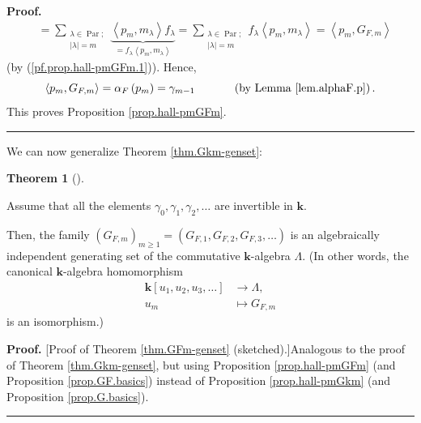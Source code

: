 \documentclass[numbers=enddot,12pt,final,onecolumn,notitlepage]{scrartcl}%
\theoremstyle{definition}
\newtheorem{theo}{Theorem}[section]
\newenvironment{theorem}[1][]
{\begin{theo}[#1]\begin{leftbar}}
{\end{leftbar}\end{theo}}
\newenvironment{proof}[1][Proof]{\noindent\textbf{#1.} }{\ \rule{0.5em}{0.5em}}
\let\sumnonlimits\sum
\renewcommand{\sum}{\sumnonlimits\limits}
\newenvironment{verlong}{}{}
\newenvironment{vershort}{}{}
\begin{document}
\begin{verlong}
\begin{proof}
\begin{align*}
&  =\sum_{\substack{\lambda\in\operatorname*{Par};\\\left\vert \lambda
\right\vert =m}}\underbrace{\left\langle p_{m},m_{\lambda}\right\rangle
f_{\lambda}}_{=f_{\lambda}\left\langle p_{m},m_{\lambda}\right\rangle }%
=\sum_{\substack{\lambda\in\operatorname*{Par};\\\left\vert \lambda\right\vert
=m}}f_{\lambda}\left\langle p_{m},m_{\lambda}\right\rangle =\left\langle
p_{m},G_{F,m}\right\rangle
\end{align*}
(by (\ref{pf.prop.hall-pmGFm.1})). Hence,%
\[
\left\langle p_{m},G_{F,m}\right\rangle =\alpha_{F}\left(  p_{m}\right)
=\gamma_{m-1}\ \ \ \ \ \ \ \ \ \ \left(  \text{by Lemma \ref{lem.alphaF.p}%
}\right)  .
\]
This proves Proposition \ref{prop.hall-pmGFm}.
\end{proof}
\end{verlong}

We can now generalize Theorem \ref{thm.Gkm-genset}:

\begin{theorem}
\label{thm.GFm-genset}Assume that all the elements $\gamma_{0},\gamma
_{1},\gamma_{2},\ldots$ are invertible in $\mathbf{k}$.

Then, the family $\left(  G_{F,m}\right)  _{m\geq1}=\left(  G_{F,1}%
,G_{F,2},G_{F,3},\ldots\right)  $ is an algebraically independent generating
set of the commutative $\mathbf{k}$-algebra $\Lambda$. (In other words, the
canonical $\mathbf{k}$-algebra homomorphism
\begin{align*}
\mathbf{k}\left[  u_{1},u_{2},u_{3},\ldots\right]   &  \rightarrow\Lambda,\\
u_{m}  &  \mapsto G_{F,m}%
\end{align*}
is an isomorphism.)
\end{theorem}

\begin{vershort}
\begin{proof}
[Proof of Theorem \ref{thm.GFm-genset} (sketched).]Analogous to the proof of
Theorem \ref{thm.Gkm-genset}, but using Proposition \ref{prop.hall-pmGFm} (and
Proposition \ref{prop.GF.basics}) instead of Proposition \ref{prop.hall-pmGkm}
(and Proposition \ref{prop.G.basics}).
\end{proof}
\end{vershort}
\end{document}
